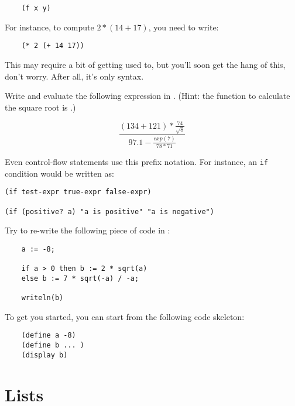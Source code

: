 \documentclass{../../../tp}
\begin{document}
\begin{verbatim}
	(f x y)
\end{verbatim}

For instance, to compute $2 * (14 + 17)$, you need to write:

\begin{verbatim}
	(* 2 (+ 14 17))
\end{verbatim}

This may require a bit of getting used to, but you'll soon get the hang of this, don't worry. After all, it's only syntax.

\begin{instruction}

Write and evaluate the following expression in \scheme. (Hint: the \scheme function to calculate the square root is .)

$$\frac{(134 + 121) * \frac{74}{\sqrt{8}}}{ 97.1 - \frac{exp(7)}{78 * 71} } $$
\end{instruction}

Even control-flow statements use this prefix notation. For instance, an \verb|if| condition would be written as:

\begin{verbatim}
(if test-expr true-expr false-expr)

(if (positive? a) "a is positive" "a is negative")
\end{verbatim}


\begin{instruction}
	
	Try to re-write the following \pascal piece of code in \scheme :
	
	\begin{verbatim}
	a := -8;
	
	if a > 0 then b := 2 * sqrt(a)
	else b := 7 * sqrt(-a) / -a;
	
	writeln(b)
	\end{verbatim}
	
	To get you started, you can start from the following code skeleton:
	
	\begin{verbatim}
	(define a -8)
	(define b ... )
	(display b)     
	\end{verbatim}
	
\end{instruction}




\section{Lists}
\end{document}
